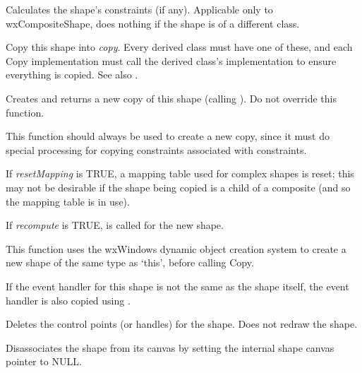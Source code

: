 
Calculates the shape's constraints (if any). Applicable
only to wxCompositeShape, does nothing if the shape is of
a different class.

\label{wxshapecopy}


Copy this shape into {\it copy}. Every derived class must have one of these, and each Copy implementation
must call the derived class's implementation to ensure everything is copied. See also .

\label{wxshapecreatenewcopy}


Creates and returns a new copy of this shape (calling ). Do not override this function.

This function should always be used to create a new copy, since it must do special processing
for copying constraints associated with constraints.

If {\it resetMapping} is TRUE, a mapping table used for complex shapes is reset; this may not be desirable
if the shape being copied is a child of a composite (and so the mapping table is in use).

If {\it recompute} is TRUE,  is called for the new shape.


This function uses the wxWindows dynamic object creation system to create a new shape of the same
type as `this', before calling Copy.

If the event handler for this shape is not the same as the shape itself, the event handler is also copied
using .



Deletes the control points (or handles) for the shape. Does not redraw
the shape.



Disassociates the shape from its canvas by setting the internal shape
canvas pointer to NULL.

